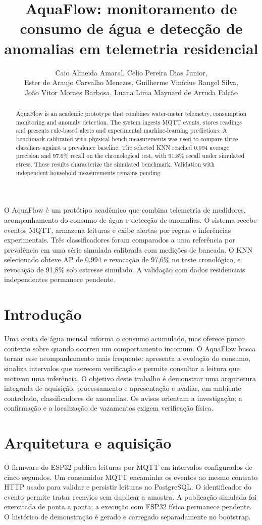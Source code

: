 \documentclass[12pt]{article}
\title{AquaFlow: monitoramento de consumo de água e detecção de anomalias em telemetria residencial}
\author{Caio Almeida Amaral\inst{1}, Celio Pereira Dias Junior\inst{1},\\
Ester de Araujo Carvalho Menezes\inst{1}, Guilherme Vinícius Rangel Silva\inst{1},\\
João Vitor Moraes Barbosa\inst{1}, Luana Lima Maynard de Arruda Falcão\inst{1}}
\begin{document}
\maketitle

\begin{abstract}
AquaFlow is an academic prototype that combines water-meter telemetry, consumption monitoring and anomaly detection. The system ingests MQTT events, stores readings and presents rule-based alerts and experimental machine-learning predictions. A benchmark calibrated with physical bench measurements was used to compare three classifiers against a prevalence baseline. The selected KNN reached 0.994 average precision and 97.6\% recall on the chronological test, with 91.8\% recall under simulated stress. These results characterize the simulated benchmark. Validation with independent household measurements remains pending.
\end{abstract}

\begin{resumo}
O AquaFlow é um protótipo acadêmico que combina telemetria de medidores, acompanhamento do consumo de água e detecção de anomalias. O sistema recebe eventos MQTT, armazena leituras e exibe alertas por regras e inferências experimentais. Três classificadores foram comparados a uma referência por prevalência em uma série simulada calibrada com medições de bancada. O KNN selecionado obteve AP de 0,994 e revocação de 97,6\% no teste cronológico, e revocação de 91,8\% sob estresse simulado. A validação com dados residenciais independentes permanece pendente.
\end{resumo}

\section{Introdução}
Uma conta de água mensal informa o consumo acumulado, mas oferece pouco contexto sobre quando ocorreu um comportamento incomum. O AquaFlow busca tornar esse acompanhamento mais frequente: apresenta a evolução do consumo, sinaliza intervalos que merecem verificação e permite consultar a leitura que motivou uma inferência. O objetivo deste trabalho é demonstrar uma arquitetura integrada de aquisição, processamento e apresentação e avaliar, em ambiente controlado, classificadores de anomalias. Os avisos orientam a investigação; a confirmação e a localização de vazamentos exigem verificação física.

\section{Arquitetura e aquisição}
O firmware do ESP32 publica leituras por MQTT em intervalos configurados de cinco segundos. Um consumidor MQTT encaminha os eventos ao mesmo contrato HTTP usado para validar e persistir leituras no PostgreSQL. O identificador do evento permite tratar reenvios sem duplicar a amostra. A publicação simulada foi exercitada de ponta a ponta; a execução com ESP32 físico permanece pendente. O histórico de demonstração é gerado e carregado separadamente no bootstrap.
\end{document}
